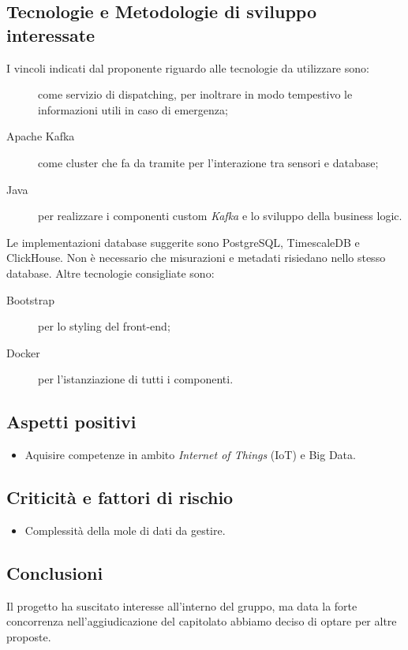 \documentclass[../studio-di-fattibilita.tex]{subfiles}
\begin{document}
  \subsection{Tecnologie e Metodologie di sviluppo interessate}%
  \label{subsec:tecnologie_interessate}
  I vincoli indicati dal proponente riguardo alle tecnologie da utilizzare sono:
  \begin{description}
    \item[] come servizio di dispatching, per inoltrare in modo tempestivo le informazioni utili in caso di emergenza;
    \item[Apache Kafka] come cluster che fa da tramite per l'interazione tra sensori e database;
    \item[Java] per realizzare i componenti custom \textit{Kafka} e lo sviluppo della business logic.
  \end{description}
  Le implementazioni database suggerite sono PostgreSQL, TimescaleDB e ClickHouse.
  Non è necessario che misurazioni e metadati risiedano nello stesso database.
  Altre tecnologie consigliate sono:
  \begin{description}
    \item[Bootstrap] per lo styling del front-end;
    \item[Docker] per l'istanziazione di tutti i componenti.
  \end{description}


  \subsection{Aspetti positivi}%
  \label{subsec:aspetti_positivi}
  \begin{itemize}
    \item Aquisire competenze in ambito \textit{Internet of Things} (IoT) e Big Data.
  \end{itemize}


  \subsection{Criticità e fattori di rischio}%
  \label{subsec:criticita_e_fattori_di_rischio}
  \begin{itemize}
    \item Complessità della mole di dati da gestire.
  \end{itemize}


  \subsection{Conclusioni}%
  \label{subsec:conclusioni}
  Il progetto ha suscitato interesse all'interno del gruppo, ma data la forte concorrenza nell'aggiudicazione del capitolato abbiamo deciso di optare per altre proposte.
\end{document}
